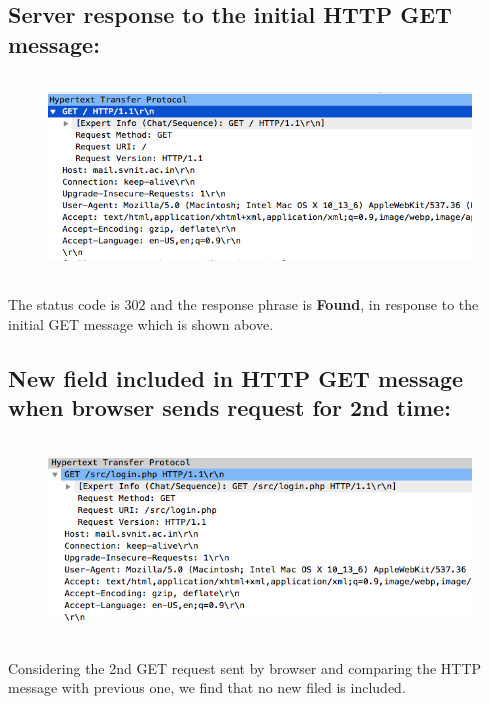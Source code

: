 \documentclass[]{report}
\begin{document}
\subsection{Server response to the initial HTTP GET message:}
\begin{figure}[H]
	\vspace{0pt}
	\includegraphics[height = 150pt, keepaspectratio]{Snapshots/q5/5_1_1.png}
\end{figure}
The status code is $302$ and the response phrase is \textbf{Found}, in response to the initial GET message which is shown above.
\subsection{New field included in HTTP GET message when browser sends request for 2nd time:}
\begin{figure}[H]
	\vspace{0pt}
	\includegraphics[height = 150pt, keepaspectratio]{Snapshots/q5/5_2.png}
\end{figure}
Considering the 2nd GET request sent by browser and comparing the HTTP message with previous one, we find that no new filed is included. 
\end{document}
